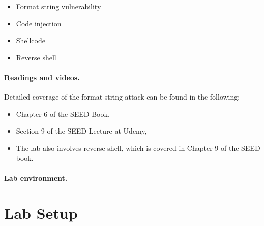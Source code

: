 \begin{itemize}[noitemsep]
\item Format string vulnerability
\item Code injection
\item Shellcode 
\item Reverse shell 
\end{itemize}


\noindent
{}


\paragraph{Readings and videos.}
Detailed coverage of the format string attack can be found in the following:

\begin{itemize}
\item Chapter 6 of the SEED Book, \seedbook
\item Section 9 of the SEED Lecture at Udemy, \seedcsvideo
\item The lab also involves reverse shell, which is covered in Chapter 9 of the SEED book.
\end{itemize}



\paragraph{Lab environment.} \seedenvironmentB




\newpage
\section{Lab Setup}



